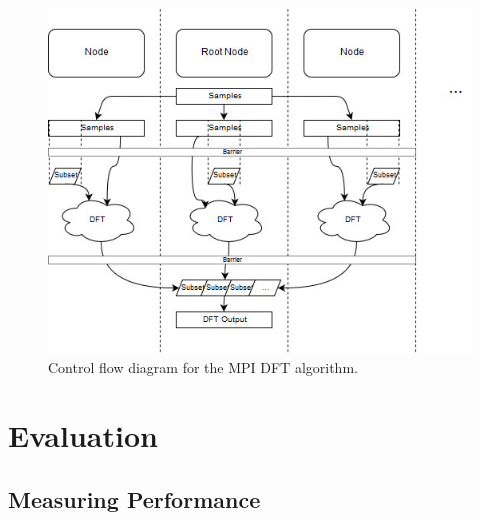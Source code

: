 \documentclass[8pt,a4paper]{article}
\begin{document}
\begin{figure}[H]
\begin{center}
\includegraphics[scale=0.7]{mpi_impl1}
\end{center}
\caption{Control flow diagram for the MPI DFT algorithm.}
\label{fig:train10x}
\end{figure}

\section{Evaluation}
\subsection{Measuring Performance}
\end{document}
